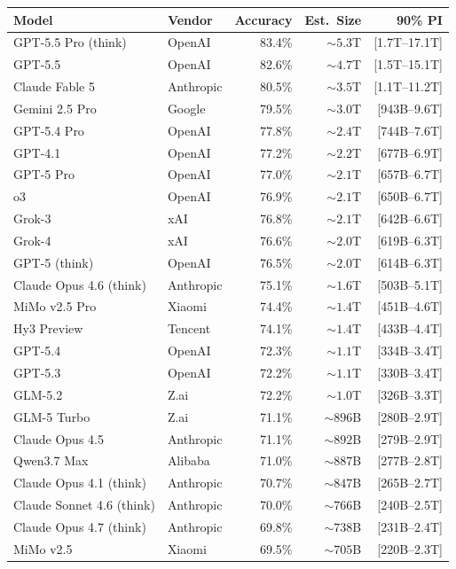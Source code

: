\begin{tabular}{llrrr}
\toprule
Model & Vendor & Accuracy & Est.\ Size & 90\% PI \\
\midrule
GPT-5.5 Pro (think) & OpenAI & 83.4\% & ${\sim}5.3$T & [1.7T--17.1T] \\
GPT-5.5 & OpenAI & 82.6\% & ${\sim}4.7$T & [1.5T--15.1T] \\
Claude Fable 5 & Anthropic & 80.5\% & ${\sim}3.5$T & [1.1T--11.2T] \\
Gemini 2.5 Pro & Google & 79.5\% & ${\sim}3.0$T & [943B--9.6T] \\
GPT-5.4 Pro & OpenAI & 77.8\% & ${\sim}2.4$T & [744B--7.6T] \\
GPT-4.1 & OpenAI & 77.2\% & ${\sim}2.2$T & [677B--6.9T] \\
GPT-5 Pro & OpenAI & 77.0\% & ${\sim}2.1$T & [657B--6.7T] \\
o3 & OpenAI & 76.9\% & ${\sim}2.1$T & [650B--6.7T] \\
Grok-3 & xAI & 76.8\% & ${\sim}2.1$T & [642B--6.6T] \\
Grok-4 & xAI & 76.6\% & ${\sim}2.0$T & [619B--6.3T] \\
GPT-5 (think) & OpenAI & 76.5\% & ${\sim}2.0$T & [614B--6.3T] \\
Claude Opus 4.6 (think) & Anthropic & 75.1\% & ${\sim}1.6$T & [503B--5.1T] \\
MiMo v2.5 Pro & Xiaomi & 74.4\% & ${\sim}1.4$T & [451B--4.6T] \\
Hy3 Preview & Tencent & 74.1\% & ${\sim}1.4$T & [433B--4.4T] \\
GPT-5.4 & OpenAI & 72.3\% & ${\sim}1.1$T & [334B--3.4T] \\
GPT-5.3 & OpenAI & 72.2\% & ${\sim}1.1$T & [330B--3.4T] \\
GLM-5.2 & Z.ai & 72.2\% & ${\sim}1.0$T & [326B--3.3T] \\
GLM-5 Turbo & Z.ai & 71.1\% & ${\sim}896$B & [280B--2.9T] \\
Claude Opus 4.5 & Anthropic & 71.1\% & ${\sim}892$B & [279B--2.9T] \\
Qwen3.7 Max & Alibaba & 71.0\% & ${\sim}887$B & [277B--2.8T] \\
Claude Opus 4.1 (think) & Anthropic & 70.7\% & ${\sim}847$B & [265B--2.7T] \\
Claude Sonnet 4.6 (think) & Anthropic & 70.0\% & ${\sim}766$B & [240B--2.5T] \\
Claude Opus 4.7 (think) & Anthropic & 69.8\% & ${\sim}738$B & [231B--2.4T] \\
MiMo v2.5 & Xiaomi & 69.5\% & ${\sim}705$B & [220B--2.3T] \\

\end{tabular}
